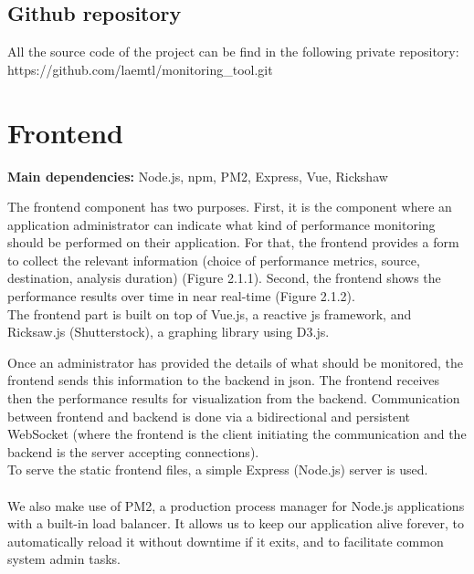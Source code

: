 \documentclass[12pt,hidelinks]{article}
\begin{document}
\subsection{Github repository}
	\vspace{-1.5mm}
	All the source code of the project can be find in the following private repository: \\
	https://github.com/laemtl/monitoring\_tool.git

    

\newpage
\section{Frontend}
\vspace{7.5cm}

\textbf{Main dependencies:} Node.js, npm, PM2, Express, Vue, Rickshaw

\vspace{3cm}

The frontend component has two purposes. First, it is the component where an application administrator can indicate what kind of performance monitoring should be performed on their application. 
For that, the frontend provides a form to collect the relevant information (choice of performance metrics, source, destination, analysis duration) (Figure 2.1.1). 
Second, the frontend shows the performance results over time in near real-time (Figure 2.1.2). \\

The frontend part is built on top of Vue.js, a reactive js framework, and Ricksaw.js (Shutterstock), a graphing library using D3.js.

Once an administrator has provided the details of what should be monitored, the frontend sends this information to the backend in json. 
The frontend receives then the performance results for visualization from the backend. 
Communication between frontend and backend is done via a bidirectional and persistent WebSocket (where the frontend is the client initiating the communication and the backend is the server accepting connections). \\

To serve the static frontend files, a simple Express (Node.js) server is used. \\
\\
We also make use of PM2, a production process manager for Node.js applications with a built-in load balancer. 
It allows us to keep our application alive forever, to automatically reload it without downtime if it exits, and to facilitate common system admin tasks.
\end{document}
